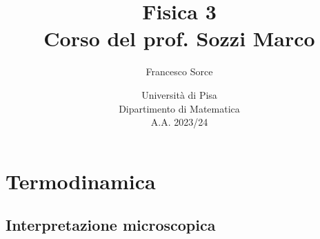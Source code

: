 \documentclass[a4paper]{report}
\title{Fisica 3\\
\large Corso del prof. Sozzi Marco}
\author{Francesco Sorce}
\date{Università di Pisa\\
Dipartimento di Matematica\\
A.A. 2023/24}
\begin{document}
\maketitle

\tableofcontents
\newpage


\part{Termodinamica}








\chapter{Interpretazione microscopica}















\appendix


%
\end{document}
